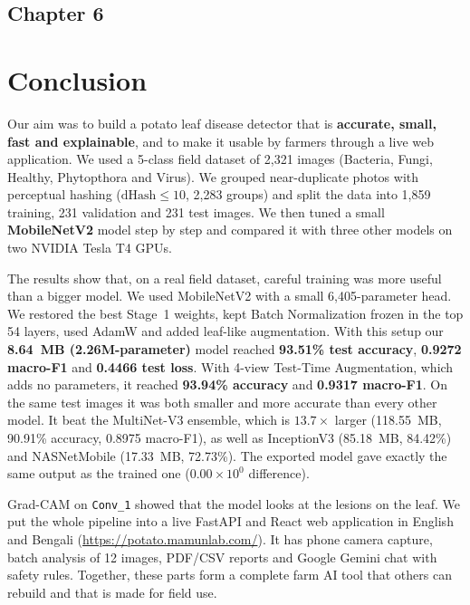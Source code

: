 \begin{center}
    \section*{\fontsize{20}{20}\selectfont Chapter 6}
\end{center}
\vspace{10mm}

\section{Conclusion}

Our aim was to build a potato leaf disease detector that is \textbf{accurate, small, fast and explainable}, and to make it usable by farmers through a live web application. We used a 5-class field dataset of 2,321 images (Bacteria, Fungi, Healthy, Phytopthora and Virus). We grouped near-duplicate photos with perceptual hashing ($\text{dHash} \le 10$, 2,283 groups) and split the data into 1,859 training, 231 validation and 231 test images. We then tuned a small \textbf{MobileNetV2} model step by step and compared it with three other models on two NVIDIA Tesla T4 GPUs.

The results show that, on a real field dataset, careful training was more useful than a bigger model. We used MobileNetV2 with a small 6,405-parameter head. We restored the best Stage~1 weights, kept Batch Normalization frozen in the top 54 layers, used AdamW and added leaf-like augmentation. With this setup our \textbf{8.64~MB (2.26M-parameter)} model reached \textbf{93.51\% test accuracy}, \textbf{0.9272 macro-F1} and \textbf{0.4466 test loss}. With 4-view Test-Time Augmentation, which adds no parameters, it reached \textbf{93.94\% accuracy} and \textbf{0.9317 macro-F1}. On the same test images it was both smaller and more accurate than every other model. It beat the MultiNet-V3 ensemble, which is $13.7\times$ larger (118.55~MB, 90.91\% accuracy, 0.8975 macro-F1), as well as InceptionV3 (85.18~MB, 84.42\%) and NASNetMobile (17.33~MB, 72.73\%). The exported model gave exactly the same output as the trained one ($0.00 \times 10^{0}$ difference).

Grad-CAM on \texttt{Conv\_1} showed that the model looks at the lesions on the leaf. We put the whole pipeline into a live FastAPI and React web application in English and Bengali (\url{https://potato.mamunlab.com/}). It has phone camera capture, batch analysis of 12 images, PDF/CSV reports and Google Gemini chat with safety rules. Together, these parts form a complete farm AI tool that others can rebuild and that is made for field use.


